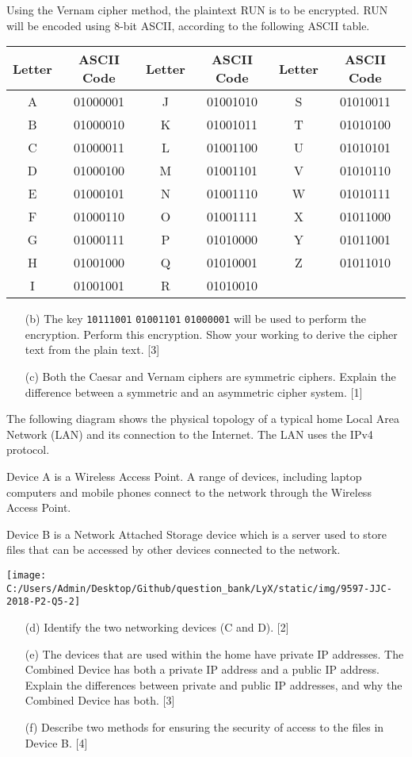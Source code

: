 Using the Vernam cipher method, the plaintext \textquotedbl RUN\textquotedbl{}
is to be encrypted. \textquotedbl RUN\textquotedbl{} will be encoded
using 8-bit ASCII, according to the following ASCII table. 
\noindent \begin{center}
\begin{tabular}{|c|c|c|c|c|c|}
\hline 
Letter & ASCII Code & Letter & ASCII Code & Letter & ASCII Code\tabularnewline
\hline 
A & 01000001 & J & 01001010 & S & 01010011\tabularnewline
\hline 
B & 01000010 & K & 01001011 & T & 01010100\tabularnewline
\hline 
C & 01000011 & L & 01001100 & U & 01010101\tabularnewline
\hline 
D & 01000100 & M & 01001101 & V & 01010110\tabularnewline
\hline 
E & 01000101 & N & 01001110 & W & 01010111\tabularnewline
\hline 
F & 01000110 & O & 01001111 & X & 01011000\tabularnewline
\hline 
G & 01000111 & P & 01010000 & Y & 01011001\tabularnewline
\hline 
H & 01001000 & Q & 01010001 & Z & 01011010\tabularnewline
\hline 
I & 01001001 & R & 01010010 & \multicolumn{1}{c}{} & \multicolumn{1}{c}{}\tabularnewline
\cline{1-4} \cline{2-4} \cline{3-4} \cline{4-4} 
\end{tabular}
\par\end{center}
\begin{enumerate}
\item[(b)]  The key \texttt{10111001} \texttt{01001101} \texttt{01000001} will
be used to perform the encryption. Perform this encryption. Show your
working to derive the cipher text from the plain text. \hfill{}{[}3{]}
\item[(c)]  Both the Caesar and Vernam ciphers are symmetric ciphers. Explain
the difference between a symmetric and an asymmetric cipher system.
\hfill{}{[}1{]}
\end{enumerate}
The following diagram shows the physical topology of a typical home
Local Area Network (LAN) and its connection to the Internet. The LAN
uses the IPv4 protocol. 

Device A is a Wireless Access Point. A range of devices, including
laptop computers and mobile phones connect to the network through
the Wireless Access Point.

Device B is a Network Attached Storage device which is a server used
to store files that can be accessed by other devices connected to
the network. 
\begin{center}
\texttt{[image: C:/Users/Admin/Desktop/Github/question\_bank/LyX/static/img/9597-JJC-2018-P2-Q5-2]}
\par\end{center}
\begin{enumerate}
\item[(d)]  Identify the two networking devices (C and D). \hfill{}{[}2{]}
\item[(e)]  The devices that are used within the home have private IP addresses.
The Combined Device has both a private IP address and a public IP
address. Explain the differences between private and public IP addresses,
and why the Combined Device has both.\hfill{} {[}3{]}
\item[(f)]  Describe two methods for ensuring the security of access to the
files in Device B. \hfill{}{[}4{]}
\end{enumerate}